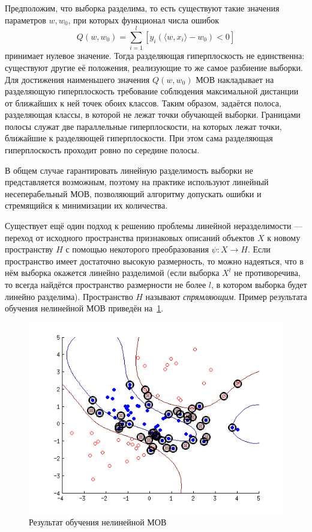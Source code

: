 Предположим, что выборка разделима, то есть существуют такие значения параметров $ w, w_0 $, при которых функционал числа ошибок
\begin{equation}
Q(w, w_0) = \sum_{i = 1}^l [y_i(\langle w, x_i \rangle - w_0) < 0]
\end{equation}
принимает нулевое значение. Тогда разделяющая гиперплоскость не единственна: существуют другие её положения, реализующие то же самое разбиение выборки. Для достижения наименьшего значения $ Q(w, w_0) $ МОВ накладывает на разделяющую гиперплоскость требование соблюдения максимальной дистанции от ближайших к ней точек обоих классов. Таким образом, задаётся полоса, разделяющая классы, в которой не лежат точки обучающей выборки. Границами полосы служат две параллельные гиперплоскости, на которых лежат точки, ближайшие к разделяющей гиперплоскости. При этом сама разделяющая гиперплоскость проходит ровно по середине полосы.

В общем случае гарантировать линейную разделимость выборки не представляется возможным, поэтому на практике используют линейный несеперабельный МОВ, позволяющий алгоритму допускать ошибки и стремящийся к минимизации их количества.

Существует ещё один подход к решению проблемы линейной неразделимости --- переход от исходного пространства признаковых описаний объектов $ X $ к новому пространству $ H $ с помощью некоторого преобразования $ \psi: X \to H $. Если пространство имеет достаточно высокую размерность, то можно надеяться, что в нём выборка окажется линейно разделимой (если выборка $ X^l $ не противоречива, то всегда найдётся пространство размерности не более $ l $, в котором выборка будет линейно разделима). Пространство $ H $ называют \textit{спрямляющим}. Пример результата обучения нелинейной МОВ приведён на~\ref{fig:NonLinSVM}.

\begin{figure}[h]
     \centering
     \includegraphics[width=1\textwidth]{include/graphics/nonlin_svm}
     \caption{Результат обучения нелинейной МОВ}
     \label{fig:NonLinSVM}
\end{figure}

